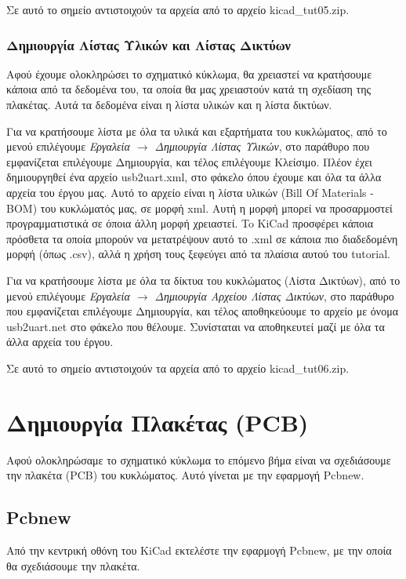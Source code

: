 \documentclass[a4paper]{article}
\begin{document}
Σε αυτό το σημείο αντιστοιχούν τα αρχεία από το αρχείο kicad\_tut05.zip.

\subsubsection{Δημιουργία Λίστας Υλικών και Λίστας Δικτύων}
Αφού έχουμε ολοκληρώσει το σχηματικό κύκλωμα, θα χρειαστεί να κρατήσουμε κάποια από τα δεδομένα του, τα οποία θα μας χρειαστούν κατά τη σχεδίαση της πλακέτας. Αυτά τα δεδομένα είναι η λίστα υλικών και η λίστα δικτύων.

Για να κρατήσουμε λίστα με όλα τα υλικά και εξαρτήματα του κυκλώματος, από το μενού επιλέγουμε \textit{Εργαλεία $\rightarrow$ Δημιουργία Λίστας Υλικών}, στο παράθυρο που εμφανίζεται επιλέγουμε Δημιουργία, και τέλος επιλέγουμε Κλείσιμο. Πλέον έχει δημιουργηθεί ένα αρχείο usb2uart.xml, στο φάκελο όπου έχουμε και όλα τα άλλα αρχεία του έργου μας. Αυτό το αρχείο είναι η λίστα υλικών (Bill Of Materials - BOM) του κυκλώματός μας, σε μορφή xml. Αυτή η μορφή μπορεί να προσαρμοστεί προγραμματιστικά σε όποια άλλη μορφή χρειαστεί. To KiCad προσφέρει κάποια πρόσθετα τα οποία μπορούν να μετατρέψουν αυτό το .xml σε κάποια πιο διαδεδομένη μορφή (όπως .csv), αλλά η χρήση τους ξεφεύγει από τα πλαίσια αυτού του tutorial.

Για να κρατήσουμε λίστα με όλα τα δίκτυα του κυκλώματος (Λίστα Δικτύων), από το μενού επιλέγουμε \textit{Εργαλεία $\rightarrow$ Δημιουργία Αρχείου Λίστας Δικτύων}, στο παράθυρο που εμφανίζεται επιλέγουμε Δημιουργία, και τέλος αποθηκεύουμε το αρχείο με όνομα usb2uart.net στο φάκελο που θέλουμε. Συνίσταται να αποθηκευτεί μαζί με όλα τα άλλα αρχεία του έργου.

Σε αυτό το σημείο αντιστοιχούν τα αρχεία από το αρχείο kicad\_tut06.zip.

\newpage
\section{Δημιουργία Πλακέτας (PCB)}
Αφού ολοκληρώσαμε το σχηματικό κύκλωμα το επόμενο βήμα είναι να σχεδιάσουμε την πλακέτα (PCB) του κυκλώματος. Αυτό γίνεται με την εφαρμογή Pcbnew.

\subsection{Pcbnew}
Από την κεντρική οθόνη του \textenglish{KiCad} εκτελέστε την εφαρμογή Pcbnew, με την οποία θα σχεδιάσουμε την πλακέτα.
\end{document}
